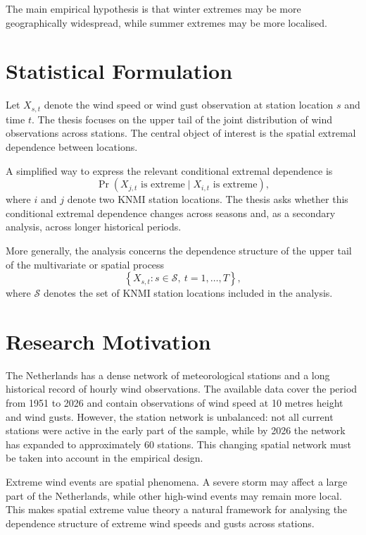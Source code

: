 \documentclass[11pt,a4paper]{article}
\begin{document}
The main empirical hypothesis is that winter extremes may be more geographically widespread, while summer extremes may be more localised.

\section{Statistical Formulation}

Let $X_{s,t}$ denote the wind speed or wind gust observation at station location $s$ and time $t$. The thesis focuses on the upper tail of the joint distribution of wind observations across stations. The central object of interest is the spatial extremal dependence between locations.

A simplified way to express the relevant conditional extremal dependence is
\begin{equation}
    \Pr\left(X_{j,t} \text{ is extreme} \mid X_{i,t} \text{ is extreme}\right),
\end{equation}
where $i$ and $j$ denote two KNMI station locations. The thesis asks whether this conditional extremal dependence changes across seasons and, as a secondary analysis, across longer historical periods.

More generally, the analysis concerns the dependence structure of the upper tail of the multivariate or spatial process
\begin{equation}
    \left\{X_{s,t}: s \in \mathcal{S},\ t = 1,\ldots,T\right\},
\end{equation}
where $\mathcal{S}$ denotes the set of KNMI station locations included in the analysis.

\section{Research Motivation}

The Netherlands has a dense network of meteorological stations and a long historical record of hourly wind observations. The available data cover the period from 1951 to 2026 and contain observations of wind speed at 10 metres height and wind gusts. However, the station network is unbalanced: not all current stations were active in the early part of the sample, while by 2026 the network has expanded to approximately 60 stations. This changing spatial network must be taken into account in the empirical design.

Extreme wind events are spatial phenomena. A severe storm may affect a large part of the Netherlands, while other high-wind events may remain more local. This makes spatial extreme value theory a natural framework for analysing the dependence structure of extreme wind speeds and gusts across stations.
\end{document}
